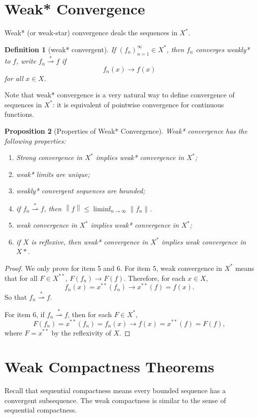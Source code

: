 \documentclass[12pt,a4paper]{report}
\numberwithin{equation}{section}
\theoremstyle{mystyle}
\newtheorem{definition}{Definition}[section]
\newtheorem{proposition}[definition]{Proposition}
\newcommand{\norm}[1]{\left\lVert #1 \right\rVert}
\begin{document}
	
	\newcommand{\weakstarto}{\overset{\ast}{\rightharpoonup}}
	\section{Weak* Convergence}
	Weak* (or weak-star) convergence deals the sequences in $X^*$.
	\begin{definition}[weak* convergent]
		If $(f_n)_{n=1}^\infty \in X^*$, then $f_n$ converges weakly* to $f$, write $f_n\weakstarto f$ if 
		$$
		f_n(x)\to f(x)
		$$
		for all $x\in X$.
	\end{definition}
	Note that weak* convergence is a very natural way to define convergence of sequences in $X^*$: it is equivalent of pointwise convergence for continuous functions.
	
	\begin{proposition}[Properties of Weak* Convergence]
		Weak* convergence has the following properties:
		\begin{enumerate}
			\item Strong convergence in $X^*$ implies weak* convergence in $X^*$;
			\item weak* limits are unique;
			\item weakly* convergent sequences are bounded;
			\item if $f_n\weakstarto f$, then $\norm{f}\leq \liminf_{n\to\infty}\norm{f_n}$.
			\item weak convergence in $X^*$ implies weak* convergence in $X^*$;
			\item if $X$ is reflexive, then weak* convergence in $X^*$ implies weak convergence in $X*$.
		\end{enumerate}
	\end{proposition}
	\begin{proof}
		We only prove for item 5 and 6. For item 5, weak convergence in $X^*$ means that for all $F\in X^{**}$, $F(f_n)\to F(f)$. Therefore, for each $x\in X$,
		$$
		f_n(x)=x^{**}(f_n)\to x^{**}(f)=f(x).
		$$
		So that $f_n\weakstarto f$.
		
		For item 6, if $f_n\weakstarto f$, then for each $F\in X^{*}$,
		$$
		F(f_n)=x^{**}(f_n)=f_n(x)\to f(x)=x^{**}(f)=F(f),
		$$
		where $F=x^{**}$ by the reflexivity of $X$.
	\end{proof}
	
	\section{Weak Compactness Theorems}
	Recall that sequential compactness means every bounded sequence has a convergent subsequence. The weak compactness is similar to the sense of sequential compactness.
	
\end{document}
